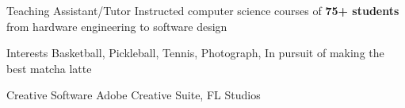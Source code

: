 

\begin{cvskills}

  \cvskill
    {Teaching Assistant/Tutor} %
    {Instructed computer science courses of \textbf{75+ students} from hardware engineering to software design} %

  \cvskill
    {Interests} %
    {Basketball, Pickleball, Tennis, Photograph, In pursuit of making the best matcha latte} %

  \cvskill
    {Creative Software} %
    {Adobe Creative Suite, FL Studios} %

\end{cvskills}

